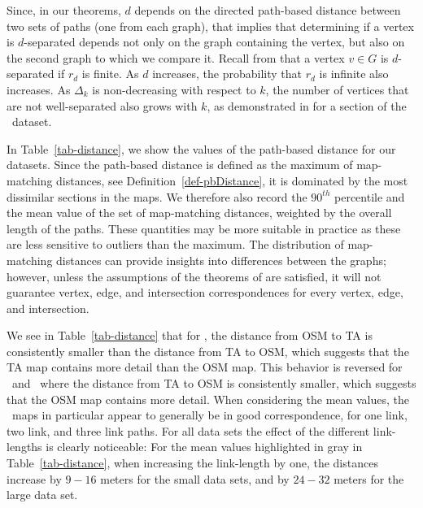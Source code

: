 Since, in our theorems,
$d$ depends on the directed
path-based distance between two sets of paths (one from each graph), that
implies that determining if a vertex is $d$-separated depends not only on the
graph containing the vertex, but also on the second graph to which we compare
it.
Recall from  that a vertex $v\in G$ is $d$-separated if
$r_d$ is finite. As $d$ increases, the probability that $r_d$ is infinite also
increases.   As $\Delta_k$ is non-decreasing with respect to $k$, the number of vertices that
are not well-separated also grows with $k$, as demonstrated in
 for a section of the \asmall\ dataset.


In Table~\ref{tab-distance}, we show the values of the path-based distance for our datasets.
Since the path-based distance is defined as the maximum of map-matching 
distances, see Definition~\ref{def-pbDistance}, it is dominated by the most 
dissimilar sections in the maps. We therefore also record the $90^{th}$ 
percentile and the mean value of the set of map-matching distances, weighted by the  
overall length of the paths. These quantities may be more suitable in practice 
as these are less sensitive to outliers than the maximum. 
The distribution of map-matching distances can provide insights into differences
between the graphs; however, unless the
assumptions of the theorems of  are satisfied, it will not
guarantee vertex, edge, and intersection
correspondences for every vertex, edge, and intersection.

We see in Table~\ref{tab-distance} that for \asmall, the distance from OSM to TA is consistently smaller than the distance from TA to OSM, which suggests that the TA map contains more detail than the OSM map. This behavior is reversed for \bsmall\ and \blarge\, where the distance from TA to OSM is consistently smaller, which suggests that the OSM map contains more detail. 
When considering the mean values, the \asmall\ maps in particular appear to 
generally be in good correspondence, for one link, two link, and three link 
paths. For all data sets the effect of the different link-lengths is clearly 
noticeable: For the mean values highlighted in gray in Table~\ref{tab-distance}, 
when increasing the link-length by one, the distances increase by $9-16$ meters 
for the small data sets, and by $24-32$ meters for the large data set.


